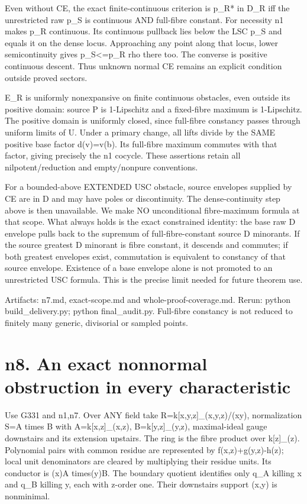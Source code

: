 \documentclass[11pt]{article}
\begin{document}
Even without CE, the exact finite-continuous criterion is p\_R* in D\_R iff the unrestricted raw p\_S is continuous AND full-fibre constant. For necessity n1 makes p\_R continuous. Its continuous pullback lies below the LSC p\_S and equals it on the dense locus. Approaching any point along that locus, lower semicontinuity gives p\_S<=p\_R rho there too. The converse is positive continuous descent. Thus unknown normal CE remains an explicit condition outside proved sectors.

E\_R is uniformly nonexpansive on finite continuous obstacles, even outside its positive domain: source P is 1-Lipschitz and a fixed-fibre maximum is 1-Lipschitz. The positive domain is uniformly closed, since full-fibre constancy passes through uniform limits of U. Under a primary change, all lifts divide by the SAME positive base factor d(v)=v(b). Its full-fibre maximum commutes with that factor, giving precisely the n1 cocycle. These assertions retain all nilpotent/reduction and empty/nonpure conventions.

For a bounded-above EXTENDED USC obstacle, source envelopes supplied by CE are in D and may have poles or discontinuity. The dense-continuity step above is then unavailable. We make NO unconditional fibre-maximum formula at that scope. What always holds is the exact constrained identity: the base raw D envelope pulls back to the supremum of full-fibre-constant source D minorants. If the source greatest D minorant is fibre constant, it descends and commutes; if both greatest envelopes exist, commutation is equivalent to constancy of that source envelope. Existence of a base envelope alone is not promoted to an unrestricted USC formula. This is the precise limit needed for future theorem use.

Artifacts: n7.md, exact-scope.md and whole-proof-coverage.md. Rerun: python build\_delivery.py; python final\_audit.py. Full-fibre constancy is not reduced to finitely many generic, divisorial or sampled points.


\section*{n8. An exact nonnormal obstruction in every characteristic}

Use G331 and n1,n7. Over ANY field take R=k[x,y,z]\_(x,y,z)/(xy), normalization S=A times B with A=k[x,z]\_(x,z), B=k[y,z]\_(y,z), maximal-ideal gauge downstairs and its extension upstairs. The ring is the fibre product over k[z]\_(z). Polynomial pairs with common residue are represented by f(x,z)+g(y,z)-h(z); local unit denominators are cleared by multiplying their residue units. Its conductor is (x)A times(y)B. The boundary quotient identifies only q\_A killing x and q\_B killing y, each with z-order one. Their downstairs support (x,y) is nonminimal.
\end{document}
